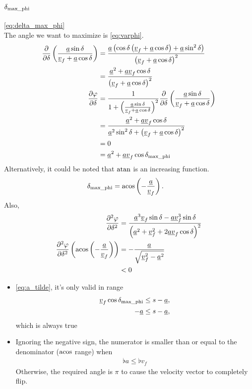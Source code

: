 \subsection{\texorpdfstring{$\delta_{\operatorname{max\_phi}}$}{delta\_max\_phi}}
\label{app:derive_delta_max_phi}
\eqref{eq:delta_max_phi}\\
The angle we want to maximize is \eqref{eq:varphi}.
\begin{align*}
\frac{\partial}{\partial\delta}\left(\frac{\flat{a}\sin\delta}{\flat{v}_f + \flat{a}\cos\delta} \right) &= \frac{\flat{a}\left(\cos\delta\left(\flat{v}_f + \flat{a}\cos\delta \right) + \flat{a}\sin^2 \delta \right)}{\left(\flat{v}_f + \flat{a}\cos\delta \right)^2}\\
&= \frac{\flat{a}^2 + \flat{a}\flat{v}_f\cos\delta}{\left(\flat{v}_f + \flat{a}\cos\delta \right)^2}\\
\frac{\partial\varphi}{\partial\delta} &= \frac{1}{1 + \left(\frac{\flat{a}\sin\delta}{\flat{v}_f + \flat{a}\cos\delta} \right)^2} \frac{\partial}{\partial\delta}\left(\frac{\flat{a}\sin\delta}{\flat{v}_f + \flat{a}\cos\delta} \right)\\
&= \frac{\flat{a}^2 + \flat{a}\flat{v}_f\cos\delta}{\flat{a}^2 \sin^2 \delta + \left(\flat{v}_f + \flat{a}\cos\delta \right)^2}\\
&= 0\\
&= \flat{a}^2 + \flat{a}\flat{v}_f\cos\delta_{\maxphi}
\end{align*}
Alternatively, it could be noted that $\operatorname{atan}$ is an increasing function.
\begin{align*}
\delta_{\maxphi} &= \acos\left( -\frac{\flat{a}}{\flat{v}_f} \right).
\end{align*}
Also,
\begin{align*}
\frac{\partial^2 \varphi}{\partial\delta^2} &= \frac{\flat{a}^3 \flat{v}_f \sin\delta - \flat{a}\flat{v}_f^3 \sin\delta}{\left(\flat{a}^2 + \flat{v}_f^2 + 2\flat{a}\flat{v}_f\cos\delta \right)^2}\\
\frac{\partial^2 \varphi}{\partial\delta^2}\left(\acos\left( -\frac{\flat{a}}{\flat{v}_f} \right) \right) &= -\frac{\flat{a}}{\sqrt{\flat{v}_f^2 - \flat{a}^2}}\\
&< 0
\end{align*}

\begin{itemize}
\item
\eqref{eq:a_tilde}, it's only valid in range
\begin{align*}
\flat{v}_f \cos\delta_{\maxphi} &\le s - \flat{a},\\
-\flat{a}&\le s - \flat{a},
\end{align*}
which is always true

\item
Ignoring the negative sign, the numerator is smaller than or equal to the denominator ($\operatorname{acos}$ range) when
\begin{align*}
\flat{a} \le \flat{v}_f
\end{align*}
Otherwise, the required angle is $\pi$ to cause the velocity vector to completely flip.
\end{itemize}

